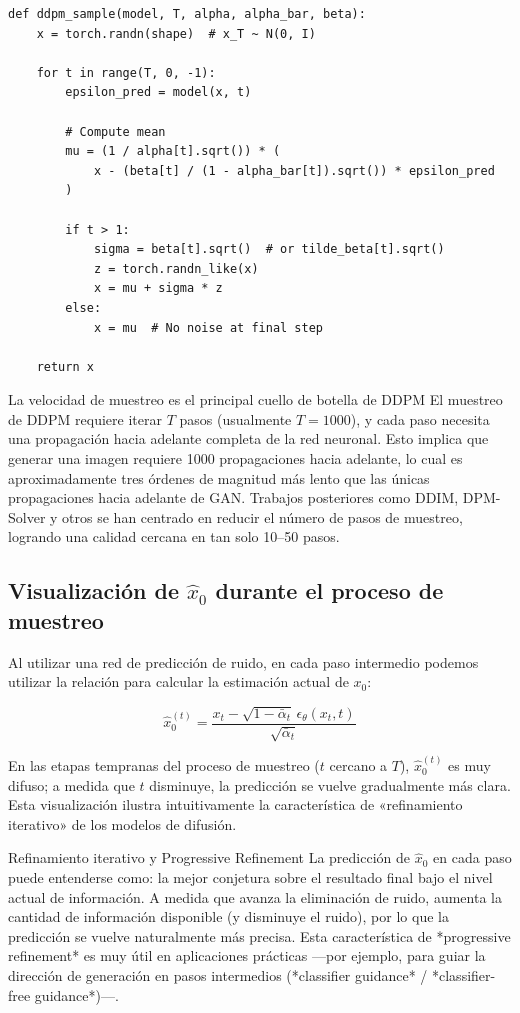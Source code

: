 \begin{lstlisting}[caption={Algoritmo de muestreo DDPM}, label=lst:sample]
def ddpm_sample(model, T, alpha, alpha_bar, beta):
    x = torch.randn(shape)  # x_T ~ N(0, I)

    for t in range(T, 0, -1):
        epsilon_pred = model(x, t)

        # Compute mean
        mu = (1 / alpha[t].sqrt()) * (
            x - (beta[t] / (1 - alpha_bar[t]).sqrt()) * epsilon_pred
        )

        if t > 1:
            sigma = beta[t].sqrt()  # or tilde_beta[t].sqrt()
            z = torch.randn_like(x)
            x = mu + sigma * z
        else:
            x = mu  # No noise at final step

    return x
\end{lstlisting}

\begin{warningbox}{La velocidad de muestreo es el principal cuello de botella de DDPM}
El muestreo de DDPM requiere iterar $T$ pasos (usualmente $T = 1000$), y cada paso necesita una propagación hacia adelante completa de la red neuronal. Esto implica que generar una imagen requiere 1000 propagaciones hacia adelante, lo cual es aproximadamente tres órdenes de magnitud más lento que las únicas propagaciones hacia adelante de GAN. Trabajos posteriores como DDIM, DPM-Solver y otros se han centrado en reducir el número de pasos de muestreo, logrando una calidad cercana en tan solo 10--50 pasos.
\end{warningbox}

\subsection{Visualización de $\hat{x}_0$ durante el proceso de muestreo}

Al utilizar una red de predicción de ruido, en cada paso intermedio podemos utilizar la relación para calcular la estimación actual de $x_0$:

$$\hat{x}_0^{(t)} = \frac{x_t - \sqrt{1-\bar{\alpha}_t}\, \epsilon_\theta(x_t, t)}{\sqrt{\bar{\alpha}_t}}$$

En las etapas tempranas del proceso de muestreo ($t$ cercano a $T$), $\hat{x}_0^{(t)}$ es muy difuso; a medida que $t$ disminuye, la predicción se vuelve gradualmente más clara. Esta visualización ilustra intuitivamente la característica de «refinamiento iterativo» de los modelos de difusión.

\begin{knowledgebox}{Refinamiento iterativo y Progressive Refinement}
La predicción de $\hat{x}_0$ en cada paso puede entenderse como: la mejor conjetura sobre el resultado final bajo el nivel actual de información. A medida que avanza la eliminación de ruido, aumenta la cantidad de información disponible (y disminuye el ruido), por lo que la predicción se vuelve naturalmente más precisa. Esta característica de *progressive refinement* es muy útil en aplicaciones prácticas —por ejemplo, para guiar la dirección de generación en pasos intermedios (*classifier guidance* / *classifier-free guidance*)—.
\end{knowledgebox}

